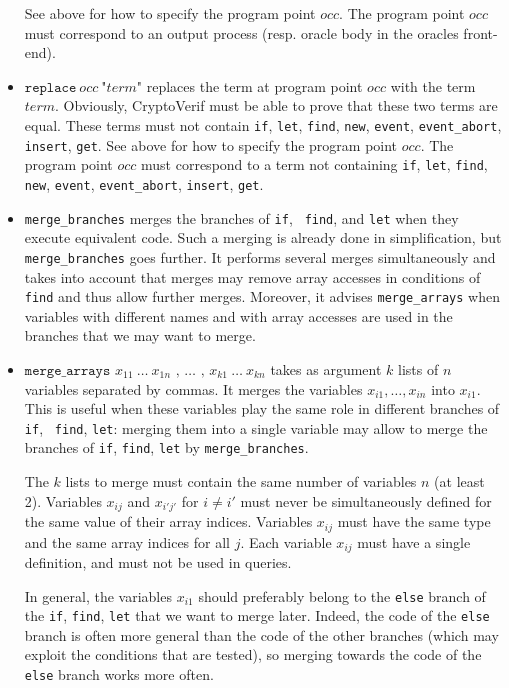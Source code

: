 \documentclass{article}
\begin{document}
\begin{itemize}
See above for how to specify the program point $occ$. 
The program point $occ$ must
correspond to an output process (resp. oracle body in the oracles
front-end).

\item $\texttt{replace}\ occ\ \texttt{"}term\texttt{"}$ replaces the term at program point
  $occ$ with the term $term$. Obviously, CryptoVerif must be able to
  prove that these two terms are equal.
  These terms must not contain \texttt{if}, \texttt{let},
  \texttt{find}, \texttt{new}, \texttt{event}, \texttt{event\_abort}, \texttt{insert}, \texttt{get}.
See above for how to specify the program point $occ$. 
The program point $occ$ must correspond to a term not containing \texttt{if}, \texttt{let},
  \texttt{find}, \texttt{new}, \texttt{event}, \texttt{event\_abort}, \texttt{insert}, \texttt{get}.

\item \texttt{merge\_branches} merges the branches of {\tt if}, {\tt
    find}, and {\tt let} when they execute equivalent code. Such a
  merging is already done in simplification, but
  \texttt{merge\_branches} goes further. It performs several merges
  simultaneously and takes into account that merges may remove array
  accesses in conditions of {\tt find} and thus allow further
  merges. Moreover, it advises {\tt merge\_arrays} when variables with
  different names and with array accesses are used in the branches
  that we may want to merge.

\item $\texttt{merge\_arrays } x_{11}\ \ldots\ x_{1n} \texttt{ , }
  \ldots \texttt{ , } x_{k1}\ \ldots\ x_{kn}$ takes as argument $k$
  lists of $n$ variables separated by commas. It merges the variables
  $x_{i1}, \ldots, x_{in}$ into $x_{i1}$. This is useful when these
  variables play the same role in different branches of {\tt if}, {\tt
    find}, {\tt let}: merging them into a single variable may allow to
  merge the branches of {\tt if}, {\tt find}, {\tt let} by
  \texttt{merge\_branches}. 

  The $k$ lists to merge must contain the same number of variables $n$
  (at least 2). Variables $x_{ij}$ and $x_{i'j'}$ for $i \neq i'$ must
  never be simultaneously defined for the same value of their array
  indices.  Variables $x_{ij}$ must have the same type and the same
  array indices for all $j$. Each variable $x_{ij}$ must have a single
  definition, and must not be used in queries.

  In general, the variables $x_{i1}$ should preferably belong to the
  \texttt{else} branch of the {\tt if}, {\tt find}, {\tt let} that we
  want to merge later. Indeed, the code of the {\tt else} branch is
  often more general than the code of the other branches (which may
  exploit the conditions that are tested), so merging towards the code
  of the {\tt else} branch works more often.


\end{itemize}
\end{document}
